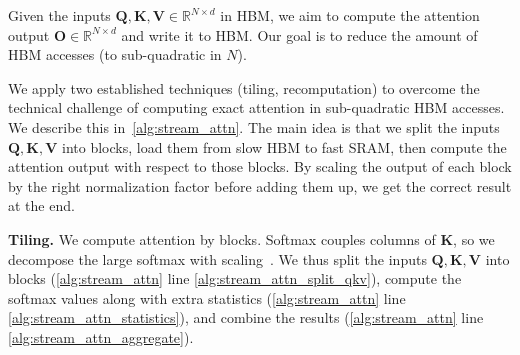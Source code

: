\documentclass{article}
\newcommand{\softmax}{\mathrm{softmax}}
\newcommand{\defeq}{:=}
\newcommand{\vQ}{\mathbf{Q}}
\newcommand{\vK}{\mathbf{K}}
\newcommand{\vV}{\mathbf{V}}
\newcommand{\vO}{\mathbf{O}}
\begin{document}
Given the inputs $\vQ, \vK, \vV \in \mathbb{R}^{N \times d}$ in HBM, we aim to compute the attention output $\vO \in \mathbb{R}^{N \times d}$ and write it to HBM.
Our goal is to reduce the amount of HBM accesses (to sub-quadratic in $N$).

We apply two established techniques (tiling, recomputation) to overcome the
technical challenge of computing exact attention in sub-quadratic HBM accesses.
We describe this in~\cref{alg:stream_attn}.
The main idea is that we split the inputs $\vQ, \vK, \vV$ into blocks,
load them from slow HBM to fast SRAM, then compute the attention output with
respect to those blocks.
By scaling the output of each block by the right normalization factor before
adding them up, we get the correct result at the end.

\textbf{Tiling.}
We compute attention by blocks.
Softmax couples columns of $\vK$,
so we decompose the large softmax
with scaling~\citep{milakov2018online, kitaev2020reformer, rabe2021self}.
\iftoggle{icmlworkshop}{}{
For numerical stability, the softmax of vector $x \in \mathbb{R}^{B}$ is computed as:
\begin{equation*}
  m(x) \defeq \max_i\ \ x_i, \quad
  f(x) \defeq \begin{bmatrix} e^{x_1 - m(x)} & \hdots & e^{x_B - m(x)} \end{bmatrix}, \quad
  \ell(x) \defeq \sum_i f(x)_i, \quad
  \softmax(x) \defeq \frac{f(x)}{\ell(x)}.
\end{equation*}
For vectors $x^{(1)}, x^{(2)} \in \mathbb{R}^{B}$, we can decompose the softmax of the concatenated $x = \begin{bmatrix} x^{(1)} \ x^{(2)} \end{bmatrix} \in \mathbb{R}^{2B}$ as:
\begin{align*}
  &m(x) = m(\begin{bmatrix} x^{(1)} \ x^{(2)} \end{bmatrix}) = \max(m(x^{(1)}), m(x^{(2)})), \quad
  f(x) = \begin{bmatrix} e^{m(x^{(1)}) - m(x)} f(x^{(1)}) & e^{m(x^{(2)}) - m(x)} f(x^{(2)}) \end{bmatrix}, \\
  &\ell(x) = \ell(\begin{bmatrix} x^{(1)} \ x^{(2)} \end{bmatrix}) = e^{m(x^{(1)}) - m(x)}\ell (x^{(1)}) + e^{m(x^{(2)}) - m(x)} \ell(x^{(2)}), \quad
  \softmax(x) = \frac{f(x)}{\ell(x)}.
\end{align*}
Therefore if we keep track of some extra statistics ($m(x), \ell(x)$), we can compute softmax one block at a time.\footnote{This style of aggregation is called \emph{algebraic aggregation}~\citep{gray1997data}.}
}
We thus split the inputs $\vQ, \vK, \vV$ into blocks (\cref{alg:stream_attn} line \ref{alg:stream_attn_split_qkv}), compute the softmax values along with extra statistics (\cref{alg:stream_attn} line \ref{alg:stream_attn_statistics}), and combine the results (\cref{alg:stream_attn} line \ref{alg:stream_attn_aggregate}).
\end{document}
